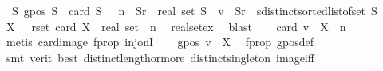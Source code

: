 \begin{isabellebody}
\ \ {\isachardoublequoteopen}{\isasymexists}S{\isachardot}{\kern0pt}\ gpos\ S\ {\isasymand}\ card\ S\ \ {\isacharequal}{\kern0pt}\ n\ {\isasymand}\ {\isacharparenleft}{\kern0pt}{\isasymexists}Sr\ {\isacharcolon}{\kern0pt}{\isacharcolon}{\kern0pt}\ real\ set{\isachardot}{\kern0pt}\ S\ {\isacharequal}{\kern0pt}\ {\isacharparenleft}{\kern0pt}v{}\ {\isacharbackquote}{\kern0pt}\ Sr{\isacharparenright}{\kern0pt}{\isacharparenright}{\kern0pt}\ {\isasymand}\ sdistinct{\isacharparenleft}{\kern0pt}sorted{\isacharunderscore}{\kern0pt}list{\isacharunderscore}{\kern0pt}of{\isacharunderscore}{\kern0pt}set\ S{\isacharparenright}{\kern0pt}{\isachardoublequoteclose}\isanewline
%
\isadelimproof
%
\endisadelimproof
%
\isatagproof
{}\isamarkupfalse%
{\isacharminus}{\kern0pt}\isanewline
\ \ \isamarkupfalse%
\ X\ \ \ rset{\isacharcolon}{\kern0pt}\ {\isachardoublequoteopen}card\ {\isacharparenleft}{\kern0pt}X\ {\isacharcolon}{\kern0pt}{\isacharcolon}{\kern0pt}\ real\ set{\isacharparenright}{\kern0pt}\ {\isacharequal}{\kern0pt}\ n{\isachardoublequoteclose}\ \isamarkupfalse%
\ real{\isacharunderscore}{\kern0pt}set{\isacharunderscore}{\kern0pt}ex\ \isamarkupfalse%
\ blast\isanewline
\ \ \isamarkupfalse%
\ {}{\isacharcolon}{\kern0pt}{\isachardoublequoteopen}card\ {\isacharparenleft}{\kern0pt}v{}\ {\isacharbackquote}{\kern0pt}\ X{\isacharparenright}{\kern0pt}\ {\isacharequal}{\kern0pt}\ n{\isachardoublequoteclose}\ \ \isamarkupfalse%
\ {\isacharparenleft}{\kern0pt}metis\ card{\isacharunderscore}{\kern0pt}image\ f{\isacharunderscore}{\kern0pt}prop{}\ inj{\isacharunderscore}{\kern0pt}onI{\isacharparenright}{\kern0pt}\isanewline
\ \ \isamarkupfalse%
\ {\isachardoublequoteopen}gpos\ {\isacharparenleft}{\kern0pt}v{}\ {\isacharbackquote}{\kern0pt}\ X{\isacharparenright}{\kern0pt}{\isachardoublequoteclose}\ \isamarkupfalse%
\ f{\isacharunderscore}{\kern0pt}prop{}\ gpos{\isacharunderscore}{\kern0pt}def\isanewline
\ \ \ \ \isamarkupfalse%
\ {\isacharparenleft}{\kern0pt}smt\ {\isacharparenleft}{\kern0pt}verit{\isacharcomma}{\kern0pt}\ best{\isacharparenright}{\kern0pt}\ distinct{\isacharunderscore}{\kern0pt}length{\isacharunderscore}{\kern0pt}{}{\isacharunderscore}{\kern0pt}or{\isacharunderscore}{\kern0pt}more\ distinct{\isacharunderscore}{\kern0pt}singleton\ image{\isacharunderscore}{\kern0pt}iff{\isacharparenright}{\kern0pt}\isanewline

\end{isabellebody}
